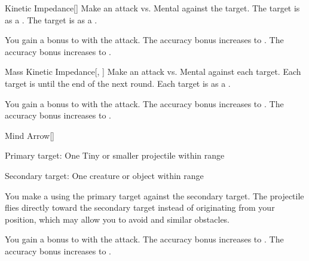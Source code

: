 \lowercase{\hypertarget{spell:Kinetic Impedance}{}}\label{spell:Kinetic Impedance}
\begin{freeability}[Rank 1]{\hypertarget{spell:Kinetic Impedance}{Kinetic Impedance}}[]
Make an attack vs. Mental against the target.
\hit The target is  as a .
\crit The target is  as a .

\rankline
{} You gain a  bonus to  with the attack.
 The accuracy bonus increases to .
 The accuracy bonus increases to .
\end{freeability}
\vspace{0.25em}



\lowercase{\hypertarget{spell:Mass Kinetic Impedance}{}}\label{spell:Mass Kinetic Impedance}
\begin{freeability}[Rank 1]{\hypertarget{spell:Mass Kinetic Impedance}{Mass Kinetic Impedance}}[, ]
Make an attack vs. Mental against each target.
\hit Each target is  until the end of the next round.
\crit Each target is  as a .

\rankline
{} You gain a  bonus to  with the attack.
 The accuracy bonus increases to .
 The accuracy bonus increases to .
\end{freeability}
\vspace{0.25em}



\lowercase{\hypertarget{spell:Mind Arrow}{}}\label{spell:Mind Arrow}
\begin{freeability}[Rank 1]{\hypertarget{spell:Mind Arrow}{Mind Arrow}}[]

Primary target: One Tiny or smaller  projectile within \rngmed range
\par\noindent
Secondary target: One creature or object within \rngmed range

You make a  using the primary target against the secondary target.
The projectile flies directly toward the secondary target instead of originating from your position, which may allow you to avoid  and similar obstacles.

\rankline
{} You gain a  bonus to  with the attack.
 The accuracy bonus increases to .
 The accuracy bonus increases to .
\end{freeability}
\vspace{0.25em}



